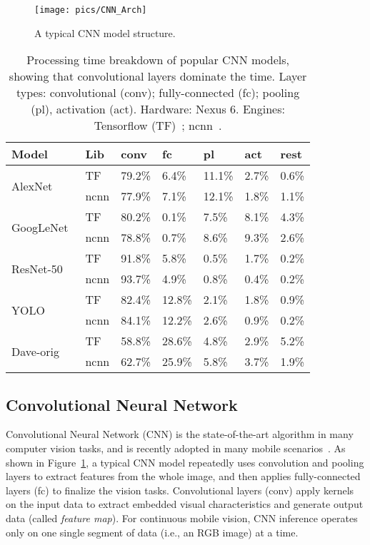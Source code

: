 \documentclass[10pt,acmtog]{acmart}
\begin{document}
\begin{figure}[t]
	\centering
	\texttt{[image: pics/CNN\_Arch]}
	\caption{A typical CNN model structure.}
	\label{fig:CNN_Arch}
\end{figure}\begin{table}[t]
\small
\centering
\begin{tabular}{|l|l|l|l|l|l|l|}
\hline
\textbf{Model} & \textbf{Lib} & \textbf{conv} & \textbf{fc} & \textbf{pl} & \textbf{act} & \textbf{rest} \\ \hline
\multirow{2}{*}{AlexNet~\cite{alexnet}} & TF & 79.2\% & 6.4\% & 11.1\% & 2.7\% & 0.6\% \\ \cline{2-7} 
 & ncnn & 77.9\% & 7.1\% & 12.1\% & 1.8\% & 1.1\% \\ \hline
\multirow{2}{*}{GoogLeNet~\cite{Inception}} & TF & 80.2\% & 0.1\% & 7.5\% & 8.1\% & 4.3\% \\ \cline{2-7} 
 & ncnn & 78.8\% & 0.7\% & 8.6\% & 9.3\% & 2.6\% \\ \hline
\multirow{2}{*}{ResNet-50~\cite{ResNet}} & TF & 91.8\% & 5.8\% & 0.5\% & 1.7\% & 0.2\% \\ \cline{2-7} 
 & ncnn & 93.7\% & 4.9\% & 0.8\% & 0.4\% & 0.2\% \\ \hline
\multirow{2}{*}{YOLO~\cite{yolo}} & TF & 82.4\% & 12.8\% & 2.1\% & 1.8\% & 0.9\%\\ \cline{2-7}
 & ncnn & 84.1\% & 12.2\% & 2.6\% & 0.9\% & 0.2\% \\ \hline
\multirow{2}{*}{Dave-orig~\cite{bojarski2016end}} & TF & 58.8\% & 28.6\% & 4.8\% & 2.9\% & 5.2\% \\ \cline{2-7} 
 & ncnn & 62.7\% & 25.9\% & 5.8\% & 3.7\% & 1.9\% \\ \hline
\end{tabular}
\caption{Processing time breakdown of popular CNN models, showing that convolutional layers dominate the time. 
Layer types: convolutional (conv); fully-connected (fc); pooling (pl), activation (act). 
Hardware: Nexus 6. 
Engines: Tensorflow (TF)~\cite{TensorFlow}; ncnn~\cite{ncnn}.
}
\label{tab:latency_breakdown}
\end{table}\subsection{Convolutional Neural Network}\label{sec:cnn}
Convolutional Neural Network (CNN) is the state-of-the-art algorithm in many computer vision tasks, and is recently adopted in many mobile scenarios~\cite{conf/mobisys/ZengCZ17,TFCamera,conf/www/YaoHZZA17,conf/ica3pp/OuLSE17,TensorZoom,conf/mobisys/MathurLBBFK17}.
As shown in Figure~\ref{fig:CNN_Arch}, a typical CNN model repeatedly uses convolution and pooling layers to extract features from the whole image, and then applies fully-connected layers (fc) to finalize the 	vision tasks.
Convolutional layers (conv) apply kernels on the input data to extract embedded visual characteristics and generate output data (called \textit{feature map}).
For continuous mobile vision, CNN inference operates only on one single segment of data (i.e., an RGB image) at a time.
\end{document}

